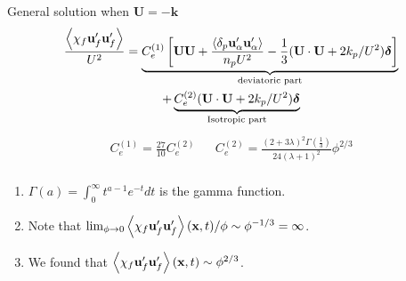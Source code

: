 \documentclass{sintefbeamer}
\begin{document}
\begin{frame}
  {General solution when $\textbf{U} = -\textbf{k}$}
  \begin{multline}
    \frac{\left<\chi_f \textbf{u}_f'\textbf{u}_f'\right>}{U^2}
    = 
    \underbrace{C^{(1)}_e \left[
        \textbf{U}\textbf{U}
        + \frac{\left<\delta_p \textbf{u}_\alpha'\textbf{u}_\alpha'\right>}{n_p U^2}
         - \frac{1}{3}(\textbf{U}\cdot \textbf{U}+2k_p/U^2)\bm\delta
    \right]}_\text{deviatoric part}\\
    + 
    \underbrace{ C^{(2)}_e  (\textbf{U}\cdot \textbf{U}+2k_p/U^2)\bm\delta}_\text{Isotropic part}
\end{multline}
\begin{align*}
  C_e^{(1)} =
  \frac{27}{10}
  C_e^{(2)}
  &&  C_e^{(2)} = \frac{(2+3\lambda)^2 \Gamma(\frac{1}{3})}{24(\lambda+1)^2}\phi^{2/3} \\
\end{align*}
\begin{enumerate}
  \item $\Gamma(a) = \int_0^\infty t^{a-1} e^{-t} dt $ is the gamma  function. 
  \item  Note that $\lim_{\phi \to 0} \left<\chi_f \textbf{u}'_f\textbf{u}'_f\right>(\textbf{x},t)/\phi \sim\phi^{-1/3} =\infty$. 
  \item We found that $\left<\chi_f \textbf{u}'_f\textbf{u}'_f\right>(\textbf{x},t)\sim\phi^{2/3}$.  
\end{enumerate}
\end{frame}
\end{document}
